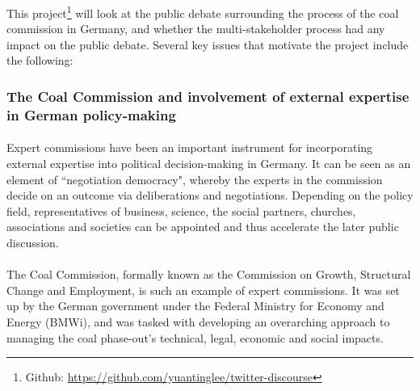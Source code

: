 \documentclass[10pt,twocolumn,letterpaper]{article}
\begin{document}

This project\footnote{Github: \hyperref[https://github.com/yuantinglee/twitter-discourse]{https://github.com/yuantinglee/twitter-discourse}} will look at the public debate surrounding the process of the coal commission in Germany, and whether the multi-stakeholder process had any impact on the public debate. Several key issues that motivate the project include the following:

\subsubsection{The Coal Commission and involvement of external expertise in German policy-making}
\paragraph{} Expert commissions have been an important instrument for incorporating external expertise into political decision-making in Germany. It can be seen as an element of ``negotiation democracy", whereby the experts in the commission decide on an outcome via deliberations and negotiations. Depending on the policy field, representatives of business, science, the social partners, churches, associations and societies can be appointed and thus accelerate the later public discussion. \cite{Siefken2016}

\paragraph{} The Coal Commission, formally known as the Commission on Growth, Structural Change and Employment, is such an example of expert commissions. It was set up by the German government under the Federal Ministry for Economy and Energy (BMWi), and was tasked with developing an overarching approach to managing the coal phase-out’s technical, legal, economic and social impacts. 
\end{document}
